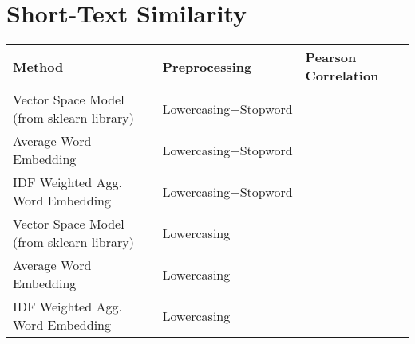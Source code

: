 \section{Short-Text Similarity}

\begin{table}[hb]
\center
\begin{tabular}{|l|l|l|}
\hline
\textbf{Method}                           & \textbf{Preprocessing} & \textbf{Pearson Correlation} \\ \hline
Vector Space Model (from sklearn library) & Lowercasing+Stopword   &                              \\ \hline
Average Word Embedding                    & Lowercasing+Stopword   &                              \\ \hline
IDF Weighted Agg. Word Embedding          & Lowercasing+Stopword   &                              \\ \hline
Vector Space Model (from sklearn library) & Lowercasing            &                              \\ \hline
Average Word Embedding                    & Lowercasing            &                              \\ \hline
IDF Weighted Agg. Word Embedding          & Lowercasing            &                              \\ \hline
\end{tabular}
\end{table}

